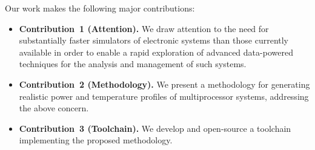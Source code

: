 Our work makes the following major contributions:

\begin{itemize}
  \item {\bfseries Contribution~1 (Attention).} We draw attention to the need
  for substantially faster simulators of electronic systems than those currently
  available in order to enable a rapid exploration of advanced data-powered
  techniques for the analysis and management of such systems.

  \item {\bfseries Contribution~2 (Methodology).} We present a methodology for
  generating realistic power and temperature profiles of multiprocessor systems,
  addressing the above concern.

  \item {\bfseries Contribution~3 (Toolchain).} We develop and open-source a
  toolchain implementing the proposed methodology.
\end{itemize}
